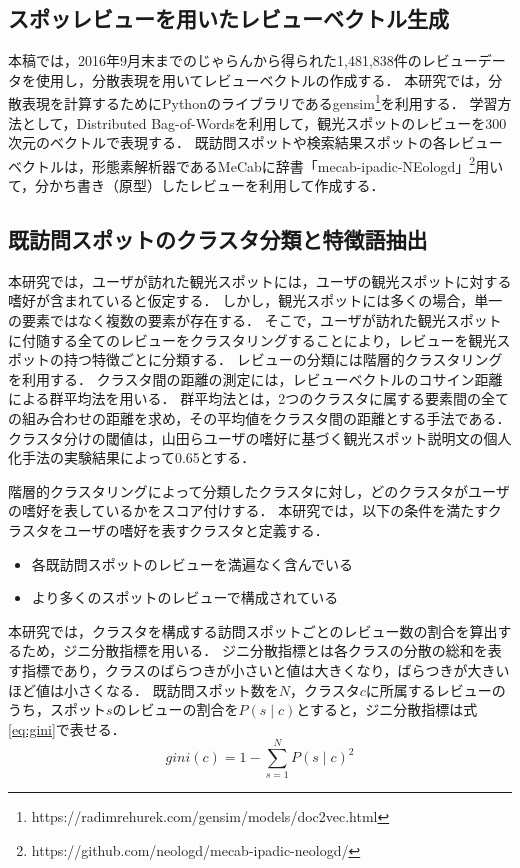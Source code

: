 \documentclass{deimj}
\begin{document}
\subsection{スポッレビューを用いたレビューベクトル生成}
本稿では，2016年9月末までのじゃらんから得られた1,481,838件のレビューデータを使用し，分散表現\cite{doc2vec}を用いてレビューベクトルの作成する．
本研究では，分散表現を計算するためにPythonのライブラリであるgensim\footnote{https://radimrehurek.com/gensim/models/doc2vec.html}を利用する．
学習方法として，Distributed Bag-of-Wordsを利用して，観光スポットのレビューを300次元のベクトルで表現する．
既訪問スポットや検索結果スポットの各レビューベクトルは，形態素解析器であるMeCab\cite{mecab}に辞書「mecab-ipadic-NEologd」\footnote{https://github.com/neologd/mecab-ipadic-neologd/}用いて，分かち書き（原型）したレビューを利用して作成する．
\subsection{既訪問スポットのクラスタ分類と特徴語抽出}
\label{sub:既訪問スポットのクラスタ分類と特徴語抽出}
本研究では，ユーザが訪れた観光スポットには，ユーザの観光スポットに対する嗜好が含まれていると仮定する．
しかし，観光スポットには多くの場合，単一の要素ではなく複数の要素が存在する．
そこで，ユーザが訪れた観光スポットに付随する全てのレビューをクラスタリングすることにより，レビューを観光スポットの持つ特徴ごとに分類する．
レビューの分類には階層的クラスタリングを利用する．
クラスタ間の距離の測定には，レビューベクトルのコサイン距離による群平均法を用いる．
群平均法とは，2つのクラスタに属する要素間の全ての組み合わせの距離を求め，その平均値をクラスタ間の距離とする手法である．
クラスタ分けの閾値は，山田ら\cite{山田}ユーザの嗜好に基づく観光スポット説明文の個人化手法の実験結果によって0.65とする．

階層的クラスタリングによって分類したクラスタに対し，どのクラスタがユーザの嗜好を表しているかをスコア付けする．
本研究では，以下の条件を満たすクラスタをユーザの嗜好を表すクラスタと定義する．
\begin{itemize}
 \item 各既訪問スポットのレビューを満遍なく含んでいる
 \item より多くのスポットのレビューで構成されている
\end{itemize}

本研究では，クラスタを構成する訪問スポットごとのレビュー数の割合を算出するため，ジニ分散指標を用いる．
ジニ分散指標とは各クラスの分散の総和を表す指標であり，クラスのばらつきが小さいと値は大きくなり，ばらつきが大きいほど値は小さくなる．
既訪問スポット数を$N$，クラスタ$c$に所属するレビューのうち，スポット$s$のレビューの割合を$P(s \mid c)$とすると，ジニ分散指標は式\ref{eq:gini}で表せる．
\begin{equation}
    gini(c)=1-\sum ^{N}_{s=1} P(s \mid c) ^{2}
    \label{eq:gini}
\end{equation}
\end{document}
